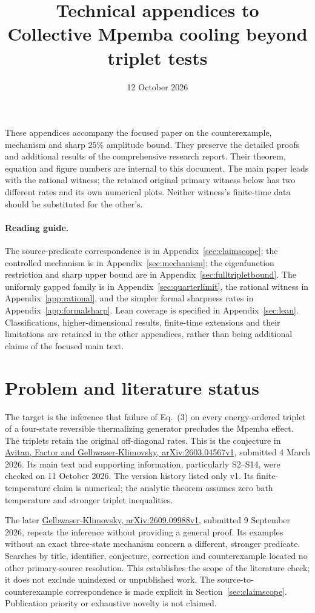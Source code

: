 \documentclass[11pt]{article}
\title{Technical appendices to\\Collective Mpemba cooling beyond triplet tests}
\author{}
\date{12 October 2026}
\begin{document}
\maketitle
These appendices accompany the focused paper on the counterexample,
mechanism and sharp $25\%$ amplitude bound. They preserve the detailed
proofs and additional results of the comprehensive research report.
Their theorem, equation and figure numbers are internal to this document.
The main paper leads with the rational witness; the retained original
primary witness below has two different rates and its own numerical plots.
Neither witness's finite-time data should be substituted for the other's.

\paragraph{Reading guide.}
The source-predicate correspondence is in Appendix~\ref{sec:claimscope};
the controlled mechanism is in Appendix~\ref{sec:mechanism};
the eigenfunction restriction and sharp upper bound are in
Appendix~\ref{sec:fulltripletbound}. The uniformly gapped family is in
Appendix~\ref{sec:quarterlimit}, the rational witness in
Appendix~\ref{app:rational}, and the simpler formal sharpness rates in
Appendix~\ref{app:formalsharp}. Lean coverage is specified in
Appendix~\ref{sec:lean}. Classifications, higher-dimensional results,
finite-time extensions and their limitations are retained in the other
appendices, rather than being additional claims of the focused main text.
\clearpage
\tableofcontents
\clearpage
\appendix
\section{Problem and literature status}
The target is the inference that failure of Eq.~(3) on every energy-ordered triplet of a four-state reversible thermalizing generator precludes the Mpemba effect. The triplets retain the original off-diagonal rates. This is the conjecture in \href{https://arxiv.org/html/2603.04567v1}{Avitan, Factor and Gelbwaser-Klimovsky, arXiv:2603.04567v1}, submitted 4 March 2026. Its main text and supporting information, particularly S2--S14, were checked on 11 October 2026. The version history listed only v1. Its finite-temperature claim is numerical; the analytic theorem assumes zero bath temperature and stronger triplet inequalities.

The later \href{https://arxiv.org/html/2609.09988v1}{Gelbwaser-Klimovsky, arXiv:2609.09988v1}, submitted 9 September 2026, repeats the inference without providing a general proof. Its examples without an exact three-state mechanism concern a different, stronger predicate. Searches by title, identifier, conjecture, correction and counterexample located no other primary-source resolution. This establishes the scope of the literature check; it does not exclude unindexed or unpublished work. The source-to-counterexample correspondence is made explicit in Section~\ref{sec:claimscope}. Publication priority or exhaustive novelty is not claimed.
\end{document}

